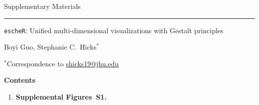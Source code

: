 \documentclass[10pt,twocolumn]{article}
\begin{document}

\clearpage 



\clearpage
\onecolumn

{\huge Supplementary Materials}

\hrule

\vspace*{0.5cm}

\begin{center}

{\Large \texttt{escheR}: Unified multi-dimensional visualizations with Gestalt principles}

\vspace*{0.75cm}

{\large Boyi Guo, Stephanie C.\ Hicks$^*$}

\vspace*{0.3cm}

{\small $^*$Correspondence to \url{shicks19@jhu.edu}}

\end{center}

\renewcommand{\figurename}{Supplementary Figure}
\renewcommand{\tablename}{Supplementary Table}
\setcounter{figure}{0}
\setcounter{table}{0}
\setcounter{section}{0}
\setcounter{page}{1}
\makeatletter
\renewcommand{\thefigure}{S\@arabic\c@figure}
\renewcommand{\thetable}{S\@arabic\c@table}
\renewcommand{\thesection}{Supplemental Note S\@arabic\c@section}
\makeatother

\vspace*{1cm}

{\bf \large Contents}

\begin{enumerate}
    \item \textbf{Supplemental Figures~S1.}
\end{enumerate}

\clearpage 

\end{document}
